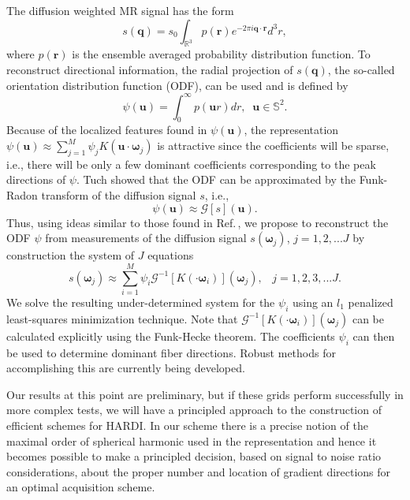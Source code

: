 \documentclass[landscape,a0b,final]{a0poster}
\newcommand{\bomega}{{\boldsymbol{\omega}}}
\newenvironment{poster}{
  \begin{center}
  \begin{minipage}[c]{0.98\textwidth}
}{
  \end{minipage} 
  \end{center}
}
\newcommand{\pbox}[4]{
\psshadowbox[#3]{
\begin{minipage}[t][#2][t]{#1}
#4
\end{minipage}
}}
\newcommand{\header}[1]{
\begin{center}\pbox{0.8\columnwidth}{}{linewidth=1mm,framearc=0.1,linecolor=lightblue,fillstyle=gradient,gradangle=0,gradbegin=white,gradend=whiteblue,gradmidpoint=1.0,framesep=1em}{\begin{center}\bf{#1}\end{center}}\end{center}
}
\begin{document}
\begin{poster}
\begin{multicols}{3}
The diffusion weighted MR signal has the form
%
\begin{equation}
  s\left(\mathbf{q}\right) = s_0\int_{\mathbb{R}^3}p\left(\mathbf{r}\right)e^{-2\pi i \mathbf{q}\cdot\mathbf{r}}d^3r,
\end{equation}
%
where $p\left(\mathbf{r}\right)$ is the ensemble averaged probability distribution function. To reconstruct directional information, the radial projection of $s\left(\mathbf{q}\right)$, the so-called orientation distribution function (ODF), can be used and is defined by
%
\begin{equation}
  \psi\left(\mathbf{u}\right) = \int_0^{\infty} p\left(\mathbf{u}r\right) dr,\;\; \mathbf{u}\in\mathbb{S}^2.
\end{equation}
Because of the localized features found in $\psi\left(\mathbf{u}\right)$, the representation $\psi\left(\mathbf{u}\right) \approx \sum_{j=1}^M \psi_j K\left(\mathbf{u}\cdot\bomega_{j}\right)$ is attractive since the coefficients will be sparse, i.e., there will be only a few dominant coefficients corresponding to the peak directions of $\psi$. Tuch \cite{TUCH-2004} showed that the ODF can be approximated by the Funk-Radon transform of the diffusion signal $s$, i.e.,
%
\begin{equation}
  \psi\left(\mathbf{u}\right) \approx \mathcal{G}\left[s\right]\left(\mathbf{u}\right).
\end{equation}
%
Thus, using ideas similar to those found in Ref.\,\cite{L-C-D-H-2009}, we propose to reconstruct the ODF $\psi$ from measurements of the diffusion signal $s\left(\bomega_{j}\right)$, $j=1,2,...J$ by construction the system of $J$ equations
%
\begin{equation}
  s\left(\bomega_{j}\right) \approx \sum_{i=1}^M \psi_i \mathcal{G}^{-1}\left[K\left(\cdot\bomega_{i}\right)\right]\left(\bomega_{j}\right), \;\;\;j=1,2,3,...J.
\end{equation}
%
We solve the resulting under-determined system for the $\psi_i$ using an $l_1$ penalized least-squares minimization technique. Note that $\mathcal{G}^{-1}\left[K\left(\cdot\bomega_{i}\right)\right]\left(\bomega_{j}\right)$ can be calculated explicitly using the Funk-Hecke theorem. The coefficients $\psi_i$ can then be used to determine dominant fiber directions. Robust methods for accomplishing this are currently being developed.

\header{Conclusions}

Our results at this point are preliminary, but if these grids perform
successfully in more complex tests, we will have a principled approach
to the construction of efficient schemes for HARDI. In our scheme
there is a precise notion of the maximal order of spherical harmonic
used in the representation and hence it becomes possible to make a
principled decision, based on signal to noise ratio considerations,
about the proper number and location of gradient directions for an
optimal acquisition scheme.


\end{multicols}
\end{poster}
\end{document}
